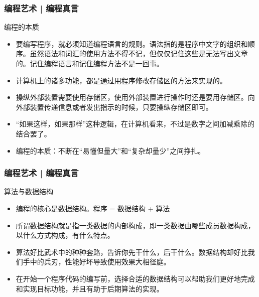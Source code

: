 \begin{frame}
  \frametitle{编程艺术 | 编程真言}
  \begin{block}{编程的本质}
    \begin{itemize}
      \item 要编写程序，就必须知道编程语言的规则。语法指的是程序中文字的组织和顺序。虽然语法和词汇的使用方法不得不记，但仅仅记住这些是无法写出文章的。记住编程语言和记住\alert{编程方法}不是一回事。
      \item 计算机上的诸多功能，都是通过\alert{用程序修改存储区}的方法来实现的。
      \item 操纵外部装置需要使用存储区，使用外部装置进行操作时还是要用存储区。向外部装置传递信息或者发出指示的时候，只要操纵存储区即可。
      \item “如果这样，如果那样”这种逻辑，在计算机看来，不过是数字之间加减乘除的结合罢了。
      \item 编程的本质：不断在“易懂但量大”和“复杂却量少”之间挣扎。
    \end{itemize}
  \end{block}
\end{frame}

\begin{frame}
  \frametitle{编程艺术 | 编程真言}
  \begin{block}{算法与数据结构}
    \begin{itemize}
      \item 编程的核心是数据结构。\alert{程序 = 数据结构 + 算法}
      \item 所谓数据结构就是指一类数据的内部构成，即一类数据由哪些成员数据构成，以什么方式构成，有什么特点。
      \item 算法好比武术中的种种套路，告诉你先干什么，后干什么。数据结构却好比我们手中的兵刃，性能好坏导致使用效果大相径庭。
      \item 在开始一个程序代码的编写前，选择合适的数据结构可以帮助我们更好地完成和实现目标功能，并且有助于后期算法的实现。
    \end{itemize}
  \end{block}
\end{frame}

